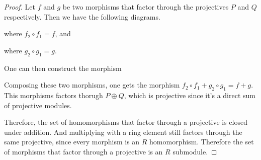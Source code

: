 \begin{proof}
    Let \( f \) and \( g \) be two morphisms that factor through the projectives \( P \) and \( Q \) respectively. Then we have the following diagrams.

    \begin{center}
    \end{center}
    where \( f_2 \circ f_1 = f \), and
    \begin{center}
    \end{center}
    where \( g_2 \circ g_1 = g \).

    One can then construct the morphism
    \begin{center}
    \end{center}

    Composing these two morphisms, one gets the morphism \( f_2 \circ f_1 + g_2 \circ g_1 = f + g \). This morphisms factors thorugh \( P \oplus Q \), which is projective since it's a direct sum of projective modules.

    Therefore, the set of homomorphisms that factor through a projective is closed under addition. And multiplying with a ring element still factors through the same projective, since every morphism is an \( R \) homomorphism. Therefore the set of morphisms that factor through a projective is an \( R \) submodule.
\end{proof}

